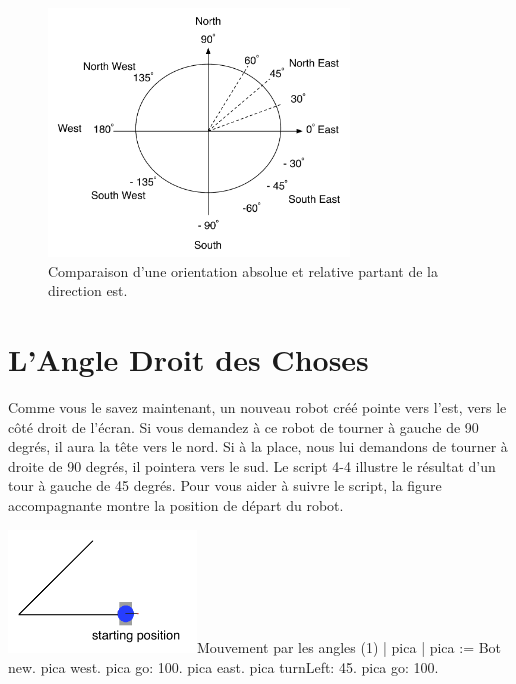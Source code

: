 \documentclass[a4paper,10pt,twoside]{book}
\begin{document}
\begin{figure}[h]
\begin{center}\includegraphics[width=8cm]{roseDesVentsRelatifToo}
\caption{Comparaison d'une orientation absolue et relative partant de la direction est.\label{fig:roserelative}}
\end{center}
\end{figure}

\section{L'Angle Droit des Choses}

Comme vous le savez maintenant, un nouveau robot cr\'e\'e pointe vers l'est, vers le côt\'e droit de l'\'ecran. 
Si vous demandez \`a ce robot de tourner \`a gauche de 90 degr\'es, il aura la t\^ete vers le nord. Si \`a la place, 
nous lui demandons de tourner \`a droite de 90 degr\'es, il pointera vers le sud. Le script 4-4 illustre le 
r\'esultat d'un tour \`a gauche de 45 degr\'es. Pour vous aider \`a suivre le script, la figure accompagnante montre 
la position de d\'epart du robot.

\begin{scriptfigwithsize}[0.5]{\includegraphics[width=5cm]{ChTurnAngleSearchAnnotated}}{Mouvement par les angles (1)}\label{xp:angle1}
	| pica | 
	pica := Bot new. 
	pica west. 
	pica go: 100. 
	pica east. 
	pica turnLeft: 45. 
	pica go: 100.
\end{scriptfigwithsize}
\end{document}
